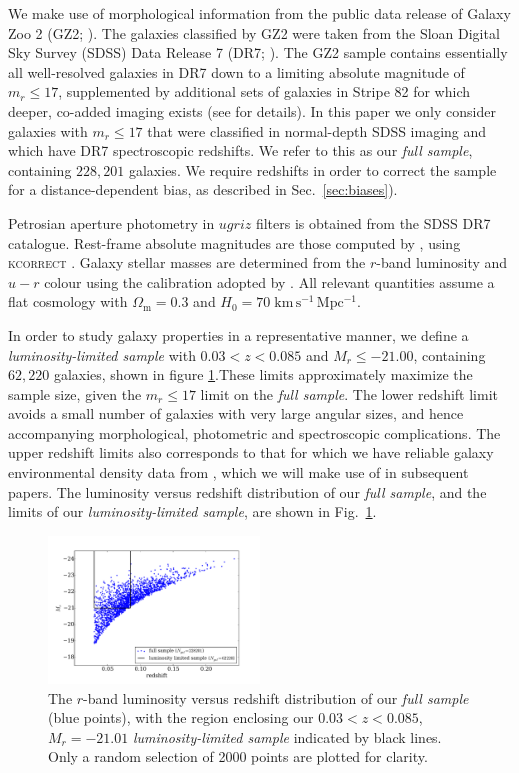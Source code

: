 \documentclass[useAMS,usenatbib]{mn2e}
\begin{document}
We make use of morphological information from the public data release of Galaxy Zoo 2 (GZ2; \citealt{Willett_13}). The galaxies classified by GZ2 were taken from the Sloan Digital Sky Survey (SDSS) Data Release 7 (DR7; \citealt{Abazijian_09}). The GZ2 sample contains essentially all well-resolved galaxies in DR7 down to a limiting absolute magnitude of $m_r \leq 17$, supplemented by additional sets of galaxies in Stripe 82 for which deeper, co-added imaging exists (see \citealt{Willett_13} for details).  In this paper we only consider galaxies with $m_r \leq 17$ that were classified in normal-depth SDSS imaging and which have DR7 spectroscopic redshifts. We refer to this as our \textit{full sample}, containing $228,201$ galaxies.  We require redshifts in order to correct the sample for a distance-dependent bias, as described in Sec.~\ref{sec:biases}).

Petrosian aperture photometry in $ugriz$ filters is obtained from the SDSS DR7 catalogue. Rest-frame absolute magnitudes are those computed by \citet{Bamford_09}, using \textsc{kcorrect} \citep{Blanton_07}. Galaxy stellar masses are determined from the $r$-band luminosity and $u-r$ colour using the calibration adopted by \citet{Baldry_06}.
All relevant quantities assume a flat cosmology with $\Omega_\mathrm{m} = 0.3$ and $H_0 = 70\;\mathrm{km\,s^{-1}\,Mpc^{-1}}$.

In order to study galaxy properties in a representative manner, we define a \textit{luminosity-limited sample} with $0.03<z<0.085$ and $M_r \le -21.00$, containing $62,220$ galaxies, shown in figure \ref{fig:vl_sample}.These limits approximately maximize the sample size, given the $m_r \le 17$ limit on the \textit{full sample}. The lower redshift limit avoids a small number of galaxies with very large angular sizes, and hence accompanying morphological, photometric and spectroscopic complications. The upper redshift limits also corresponds to that for which we have reliable galaxy environmental density data from \cite{Baldry_06}, which we will make use of in subsequent papers.  The luminosity versus redshift distribution of our \textit{full sample}, and the limits of our \textit{luminosity-limited sample}, are shown in Fig.~\ref{fig:vl_sample}.

\begin{figure}
		\centering
		\includegraphics[width=0.5\textwidth]{Images/Data/volume_limited_sample.pdf}
    \caption{The $r$-band luminosity versus redshift distribution of our \textit{full sample} (blue points), with the region enclosing our $0.03<z<0.085$, $M_r  = -21.01$ \textit{luminosity-limited sample} indicated by black lines. Only a random selection of 2000 points are plotted for clarity.
		\label{fig:vl_sample}}
\end{figure}
\end{document}

